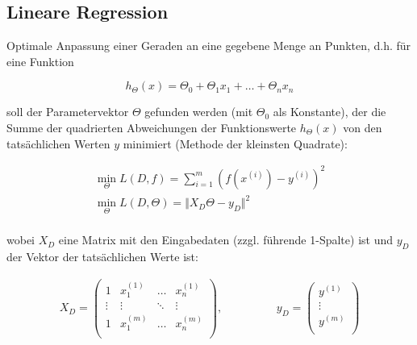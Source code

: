 \subsection{Lineare Regression}
\label{linearRegression}
Optimale Anpassung einer Geraden an eine gegebene Menge an Punkten, d.h. für eine Funktion

\begin{equation*}
    h_{\Theta}(x) = \Theta_0 + \Theta_1x_1 + \dots + \Theta_nx_n
\end{equation*}

soll der Parametervektor $\Theta$ gefunden werden (mit $\Theta_0$ als Konstante), der die Summe der quadrierten Abweichungen der Funktionswerte $h_{\Theta}(x)$ von den tatsächlichen Werten $y$ minimiert (Methode der kleinsten Quadrate):

\begin{equation*}
    \begin{split}
        \underset{\Theta}{\min} L(D, f) = \sum_{i=1}^{m}(f(x^{(i)}) - y^{(i)})^2\\
        \underset{\Theta}{\min} L(D, \Theta) = \Vert X_D\Theta-y_D\Vert^2\\
    \end{split}
\end{equation*}

wobei $X_D$ eine Matrix mit den Eingabedaten (zzgl. führende 1-Spalte) ist und $y_D$ der Vektor der tatsächlichen Werte ist:

\begin{equation*}
    \begin{split}
        X_D=
        \begin{pmatrix}
            1 & x_1^{(1)} & \dots & x_n^{(1)}\\
            \vdots & \vdots & \ddots & \vdots\\
            1 & x_1^{(m)} & \dots & x_n^{(m)}\\
        \end{pmatrix},\hspace{2cm}
        y_D=
        \begin{pmatrix}
            y^{(1)}\\
            \vdots\\
            y^{(m)}\\
        \end{pmatrix}
    \end{split}
\end{equation*}

